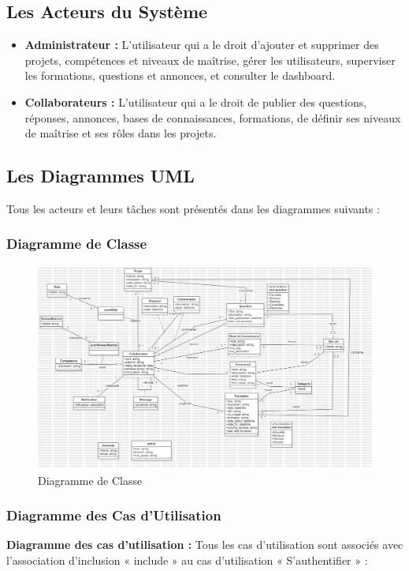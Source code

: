 \documentclass{article}
\begin{document}
        \subsection{Les Acteurs du Système}  
            \begin{itemize}
                \item \textbf{Administrateur :} L'utilisateur qui a le droit d'ajouter et supprimer des projets, compétences et niveaux de maîtrise, gérer les utilisateurs, superviser les formations, questions et annonces, et consulter le dashboard.
                \item \textbf{Collaborateurs :} L'utilisateur qui a le droit de publier des questions, réponses, annonces, bases de connaissances, formations, de définir ses niveaux de maîtrise et ses rôles dans les projets.
            \end{itemize}
        \subsection{Les Diagrammes UML}
            Tous les acteurs et leurs tâches sont présentés dans les diagrammes suivants :
            
            \subsubsection{Diagramme de Classe}
                \begin{figure}[h!]
                    \centering
                    \includegraphics[width=1.0\textwidth]{assets/diagrammes/class.jpg}
                    \caption{Diagramme de Classe}
                \end{figure}
                \FloatBarrier 

            \subsubsection{Diagramme des Cas d'Utilisation}
                \textbf{Diagramme des cas d'utilisation :} Tous les cas d'utilisation sont associés avec l'association d'inclusion « include » au cas d'utilisation « S'authentifier » :
                
\end{document}
